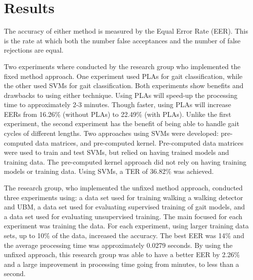 \documentclass{sig-alternate}
\begin{document}

	
\section{Results}
	The accuracy of either method is measured by the Equal Error Rate (EER). This is the rate at which both the number false acceptances and the number of false rejections are equal.
	
	Two experiments where conducted by the research group who implemented the fixed method approach. One experiment used PLAs for gait classification, while the other used SVMs for gait classification. Both experiments show benefits and drawbacks to using either technique. Using PLAs will speed-up the processing time to approximately 2-3 minutes. Though faster, using PLAs will increase EERs from 16.26\% (without PLAs) to 22.49\% (with PLAs). Unlike the first experiment, the second experiment has the benefit of being able to handle gait cycles of different lengths. Two approaches using SVMs were developed: pre-computed data matrices, and pre-computed kernel. Pre-computed data matrices were used to train and test SVMs, but relied on having trained models and training data. The pre-computed kernel approach did not rely on having training models or training data. Using SVMs, a TER of 36.82\% was achieved. 
	
		
		The research group, who implemented the unfixed method approach, conducted three experiments using: a data set used for training walking a walking detector and UBM, a data set used for evaluating supervised training of gait models, and a data set used for evaluating unsupervised training. The main focused for each experiment was training the data. For each experiment, using larger training data sets, up to 10\% of the data, increased the accuracy. The best EER was 14\% and the average processing time was approximately 0.0279 seconds. By using the unfixed approach, this research group was able to have a better EER by 2.26\% and a large improvement in processing time going from minutes, to less than a second.
\end{document}
